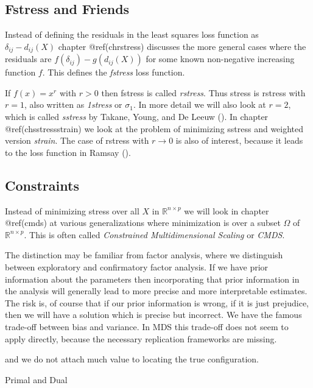 \documentclass[
  12pt,
  letterpaper,
  DIV=11,
  numbers=noendperiod]{scrartcl}
\begin{document}
\subsection{Fstress and Friends}\label{genfstress}

Instead of defining the residuals in the least squares loss function as
\(\delta_{ij}-d_{ij}(X)\) chapter @ref(chrstress) discusses the more
general cases where the residuals are \(f(\delta_{ij})-g(d_{ij}(X))\)
for some known non-negative increasing function \(f\). This defines the
\emph{fstress} loss function.

If \(f(x)=x^r\) with \(r>0\) then fstress is called \emph{rstress}. Thus
stress is rstress with \(r=1\), also written as \emph{1stress} or
\(\sigma_1\). In more detail we will also look at \(r=2\), which is
called \emph{sstress} by Takane, Young, and De Leeuw
(). In chapter
@ref(chsstressstrain) we look at the problem of minimizing sstress and
weighted version \emph{strain}. The case of rstress with
\(r\rightarrow 0\) is also of interest, because it leads to the loss
function in Ramsay ().

\subsection{Constraints}\label{gencons}

Instead of minimizing stress over all \(X\) in
\(\mathbb{R}^{n\times p}\) we will look in chapter @ref(cmds) at various
generalizations where minimization is over a subset \(\mathcal{\Omega}\)
of \(\mathbb{R}^{n\times p}\). This is often called \emph{Constrained
Multidimensional Scaling} or \emph{CMDS}.

The distinction may be familiar from factor analysis, where we
distinguish between exploratory and confirmatory factor analysis. If we
have prior information about the parameters then incorporating that
prior information in the analysis will generally lead to more precise
and more interpretable estimates. The risk is, of course that if our
prior information is wrong, if it is just prejudice, then we will have a
solution which is precise but incorrect. We have the famous trade-off
between bias and variance. In MDS this trade-off does not seem to apply
directly, because the necessary replication frameworks are missing.

and we do not attach much value to locating the true configuration.

Primal and Dual
\end{document}

